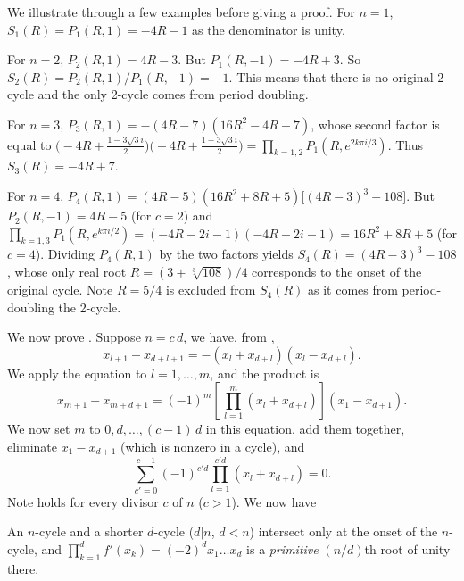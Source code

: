 \documentclass[twocolumn]{revtex4-1}
\begin{document}
We illustrate  through a few examples
  before giving a proof.
%
For $n = 1$,
$S_1(R) = P_1(R, 1) = -4R - 1$
as the denominator is unity.


For $n = 2$,
$P_2(R, 1) = 4R - 3$.
But $P_1(R, -1) = -4R + 3$.
So $S_2(R) = P_2(R, 1)/P_1(R, -1) = -1$.
This means that there is no original 2-cycle
  and the only 2-cycle comes from period doubling.


For $n = 3$,
$P_3(R, 1) = -(4R - 7)(16 R^2 - 4 R + 7)$,
whose second factor is equal to
$
\big(-4R + \frac{1 - 3 \sqrt3 i}{2}\big)
\big(-4R + \frac{1 + 3 \sqrt3 i}{2}\big)
= \prod_{k=1,2} P_1(R, e^{2 k \pi i/3})$.
%
Thus $S_3(R) = -4R + 7$.



For $n = 4$,
$P_4(R, 1)
= (4R - 5) (16 R^2 + 8 R + 5)
  \bigl[
    (4R - 3)^3 - 108
  \bigr]$.
But
$P_2(R, -1) = 4R - 5$ (for $c = 2$)
and
$\prod_{k=1,3} P_1(R, e^{k\pi i/2})
=(-4R-2i-1)(-4R+2i-1)
=16R^2+8R+5$
(for $c = 4$).
Dividing $P_4(R, 1)$ by the two factors yields
$S_4(R) = (4R-3)^3 - 108$,
  whose only real root $R=(3+\sqrt[3]{108})/4$ corresponds to
  the onset of the original cycle.
Note $R = 5/4$ is excluded from $S_4(R)$
  as it comes from period-doubling the 2-cycle.





We now prove .
Suppose $n = c \,d$, we have, from ,
\[
  x_{l+1} - x_{d+l+1} = - (x_l + x_{d+l}) (x_l - x_{d+l}).
\]
We apply the equation to $l = 1, \ldots, m$, and the product is
\[
  x_{m+1} - x_{m + d+1} =
  (-1)^{m} \left[ \, \prod_{l=1}^{m} (x_l + x_{d+l}) \right]
    (x_1 - x_{d+1}).
\]
We now set $m$ to $0, d, \ldots, (c-1)\,d$ in this equation,
  add them together, eliminate $x_1 - x_{d+1}$
  (which is nonzero in a cycle), and
\begin{equation}
  \sum_{c' = 0}^{c-1}
    (-1)^{c' d} \prod_{l=1}^{c' d} (x_l + x_{d+l})
   = 0.
\label{eq:stair}
\end{equation}
%
Note  holds for every divisor $c$ of $n$ ($c > 1$). We now have



\begin{theorem}
An $n$-cycle and a shorter $d$-cycle ($d|n$, $d< n$)
  intersect only at the onset of the $n$-cycle,
%
and $\prod_{k=1}^{d} f'(x_k) = (-2)^d x_1 \dots x_d$ is
a \emph{primitive} $(n/d)$th root of unity there.
\label{thm:cbifur}
\end{theorem}
\end{document}
